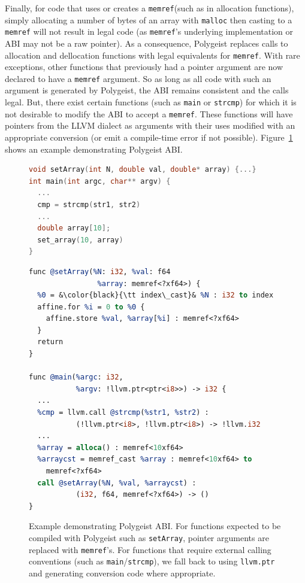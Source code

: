 \documentclass[sigplan]{acmart}
\newcommand{\icode}[1]{{\texttt {#1}}}
\newcommand{\tool}{Polygeist\xspace}
\newcommand{\memref}{\icode{memref}\xspace}
\begin{document}
Finally, for code that uses or creates a \memref (such as in allocation functions), simply allocating a number of bytes of an array with \icode{malloc} then casting to a \memref will not result in legal code (as \memref's underlying implementation or ABI may not be a raw pointer). As a consequence, \tool replaces calls to allocation and dellocation functions with legal equivalents for \memref. With rare exceptions, other functions that previously had a pointer argument are now declared to have a \memref argument. So as long as all code with such an argument is generated by \tool, the ABI remains consistent and the calls legal. But, there exist certain functions (such as \texttt{main} or \texttt{strcmp}) for which it is not desirable to modify the ABI to accept a \memref. These functions will have pointers from the LLVM dialect as arguments with their uses modified with an appropriate conversion (or emit a compile-time error if not possible). Figure~\ref{fig:abi} shows an example demonstrating \tool ABI.

\begin{figure}
    \centering
    \scriptsize
\begin{lstlisting}[language=c]
void setArray(int N, double val, double* array) {...}
int main(int argc, char** argv) {
  ...
  cmp = strcmp(str1, str2)
  ...
  double array[10];
  set_array(10, array)
}
\end{lstlisting}
\scriptsize
\begin{lstlisting}[language=llvm, escapeinside=&&]
func @setArray(%N: i32, %val: f64
                %array: memref<?xf64>) {
  %0 = &\color{black}{\tt index\_cast}& %N : i32 to index
  affine.for %i = 0 to %0 {
    affine.store %val, %array[%i] : memref<?xf64>
  }
  return
}

func @main(%argc: i32,
           %argv: !llvm.ptr<ptr<i8>>) -> i32 {
  ...
  %cmp = llvm.call @strcmp(%str1, %str2) :
           (!llvm.ptr<i8>, !llvm.ptr<i8>) -> !llvm.i32
  ...
  %array = alloca() : memref<10xf64>
  %arraycst = memref_cast %array : memref<10xf64> to 
    memref<?xf64>
  call @setArray(%N, %val, %arraycst) :
           (i32, f64, memref<?xf64>) -> ()
}
\end{lstlisting}
    \caption{Example demonstrating \tool ABI. For functions expected to be compiled with \tool such as \icode{setArray}, pointer arguments are replaced with \memref's. For functions that require external calling conventions (such as \icode{main}/\icode{strcmp}), we fall back to using \icode{llvm.ptr} and generating conversion code where appropriate. }
    \label{fig:abi}
\end{figure}
\end{document}

